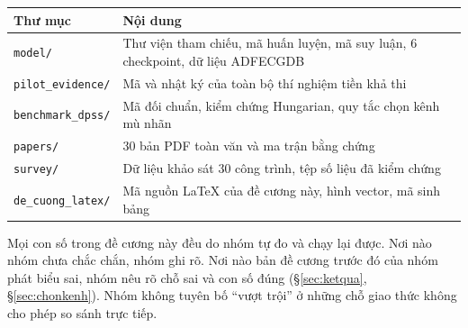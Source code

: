\begin{table}[H]\centering\small
\begin{tabular}{@{}L{5.0cm} L{9.4cm}@{}}
\toprule
\textbf{Thư mục} & \textbf{Nội dung} \\
\midrule
\texttt{model/} & Thư viện tham chiếu, mã huấn luyện, mã suy luận, 6 checkpoint, dữ liệu ADFECGDB \\
\texttt{pilot\_evidence/} & Mã và nhật ký của toàn bộ thí nghiệm tiền khả thi \\
\texttt{benchmark\_dpss/} & Mã đối chuẩn, kiểm chứng Hungarian, quy tắc chọn kênh mù nhãn \\
\texttt{papers/} & 30 bản PDF toàn văn và ma trận bằng chứng \\
\texttt{survey/} & Dữ liệu khảo sát 30 công trình, tệp số liệu đã kiểm chứng \\
\texttt{de\_cuong\_latex/} & Mã nguồn LaTeX của đề cương này, hình vector, mã sinh bảng \\
\bottomrule
\end{tabular}
\end{table}

\vfill
\begin{ghichu}[title={Cam kết về tính liêm chính}]
\small
Mọi con số trong đề cương này đều do nhóm tự đo và chạy lại được. Nơi nào nhóm chưa chắc chắn,
nhóm ghi rõ. Nơi nào bản đề cương trước đó của nhóm phát biểu sai, nhóm nêu rõ chỗ sai và con số đúng
(\S\ref{sec:ketqua}, \S\ref{sec:chonkenh}). Nhóm không tuyên bố ``vượt trội'' ở những chỗ giao thức
không cho phép so sánh trực tiếp.
\end{ghichu}
